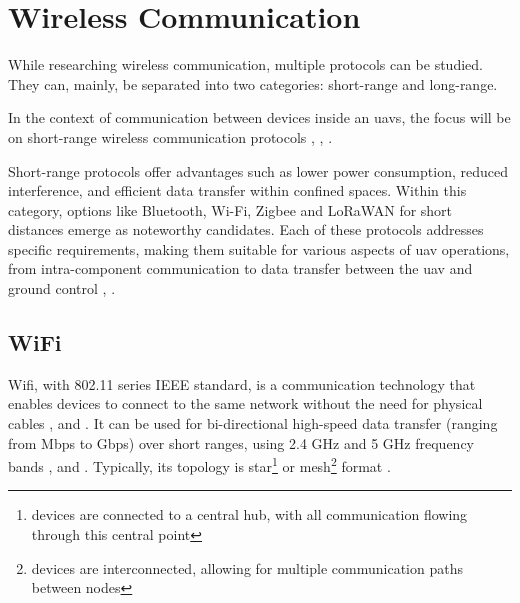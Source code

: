 

\section{Wireless Communication}

While researching wireless communication, multiple protocols can be studied.
They can, mainly, be separated into two categories: short-range and long-range.

In the context of communication between devices inside an \glspl{uav}, the focus will be on short-range wireless communication protocols \cite{WCOM1}, \cite{WCOM6}, \cite{WCOM7}.

Short-range protocols offer advantages such as lower power consumption, reduced interference, and efficient data transfer within confined spaces.
Within this category, options like Bluetooth, Wi-Fi, Zigbee and \gls{LoRaWAN} for short distances emerge as noteworthy candidates.
Each of these protocols addresses specific requirements, making them suitable for various aspects of \gls{uav} operations, from intra-component communication to data transfer between the \gls{uav} and ground control \cite{WCOM6}, \cite{WCOM7}.

\subsection{WiFi}
\gls{Wifi}, with 802.11 series \gls{IEEE} standard, is a communication technology that enables devices to connect to the same network without the need for physical cables \cite{WCOM8}, \cite{WCOM11} and \cite{WCOM12}.
It can be used for bi-directional high-speed data transfer (ranging from Mbps to Gbps) over short ranges, using 2.4 GHz and 5 GHz frequency bands \cite{WCOM8}, \cite{WCOM11} and \cite{WCOM12}.
Typically, its topology is star\footnote{devices are connected to a central hub, with all communication flowing through this central point} or mesh\footnote{devices are interconnected, allowing for multiple communication paths between nodes} format \cite{WCOM8}.

